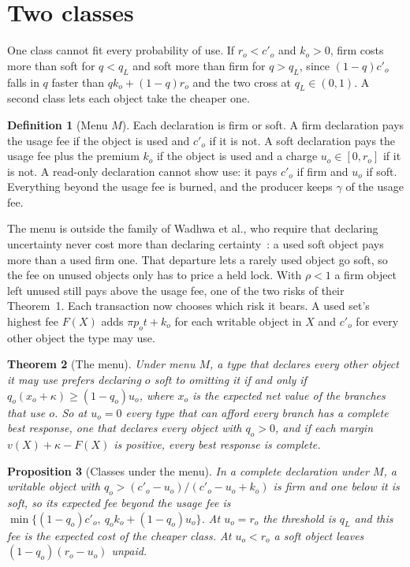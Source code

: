 \documentclass[conference,compsoc]{IEEEtran}
\numberwithin{equation}{section}
\theoremstyle{plain}
\newtheorem{theorem}{Theorem}[section]
\newtheorem{proposition}[theorem]{Proposition}
\theoremstyle{definition}
\newtheorem{definition}[theorem]{Definition}
\theoremstyle{remark}
\newcommand{\cp}{c'}
\newcommand{\qL}{q_L}
\begin{document}
\section{Two classes}\label{sec:menu}

One class cannot fit every probability of use. If $r_o < \cp_o$ and $k_o > 0$, firm costs more than soft for $q < \qL$ and soft more than firm for $q > \qL$, since $(1-q)\cp_o$ falls in $q$ faster than $q k_o + (1-q) r_o$ and the two cross at $\qL \in (0,1)$. A second class lets each object take the cheaper one.

\begin{definition}[Menu $M$]\label{def:menu}
Each declaration is firm or soft. A firm declaration pays the usage fee if the object is used and $\cp_o$ if it is not. A soft declaration pays the usage fee plus the premium $k_o$ if the object is used and a charge $u_o \in [0, r_o]$ if it is not. A read-only declaration cannot show use: it pays $\cp_o$ if firm and $u_o$ if soft. Everything beyond the usage fee is burned, and the producer keeps $\gamma$ of the usage fee.
\end{definition}

The menu is outside the family of Wadhwa et al., who require that declaring uncertainty never cost more than declaring certainty~\cite[Section~3]{wadhwa2026perils}: a used soft object pays more than a used firm one. That departure lets a rarely used object go soft, so the fee on unused objects only has to price a held lock. With $\rho < 1$ a firm object left unused still pays above the usage fee, one of the two risks of their Theorem~1. Each transaction now chooses which risk it bears. A used set's highest fee $F(X)$ adds $\pi p_o t + k_o$ for each writable object in $X$ and $\cp_o$ for every other object the type may use.

\begin{theorem}[The menu]\label{thm:menu}
Under menu $M$, a type that declares every other object it may use prefers declaring $o$ soft to omitting it if and only if $q_o (x_o + \kappa) \ge (1-q_o) u_o$, where $x_o$ is the expected net value of the branches that use $o$. So at $u_o = 0$ every type that can afford every branch has a complete best response, one that declares every object with $q_o > 0$, and if each margin $v(X) + \kappa - F(X)$ is positive, every best response is complete.
\end{theorem}

\begin{proposition}[Classes under the menu]\label{prop:class}
In a complete declaration under $M$, a writable object with $q_o > (\cp_o - u_o)/(\cp_o - u_o + k_o)$ is firm and one below it is soft, so its expected fee beyond the usage fee is $\min\{(1-q_o)\cp_o,\ q_o k_o + (1-q_o) u_o\}$. At $u_o = r_o$ the threshold is $\qL$ and this fee is the expected cost of the cheaper class. At $u_o < r_o$ a soft object leaves $(1-q_o)(r_o - u_o)$ unpaid.
\end{proposition}
\end{document}
